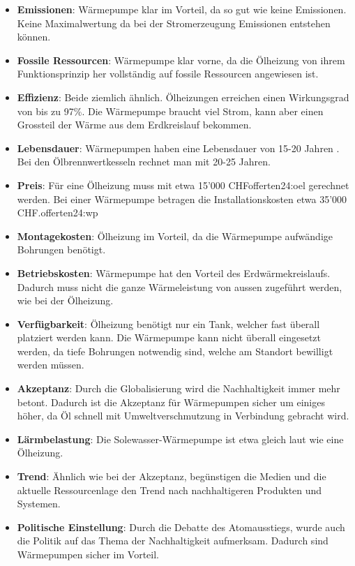 \begin{itemize}

\item \textbf{Emissionen}: Wärmepumpe klar im Vorteil, da so gut wie keine Emissionen. Keine Maximalwertung da bei der Stromerzeugung Emissionen entstehen können.

\item \textbf{Fossile Ressourcen}: Wärmepumpe klar vorne, da die Ölheizung von ihrem Funktionsprinzip her vollständig auf fossile Ressourcen angewiesen ist.

\item \textbf{Effizienz}: Beide ziemlich ähnlich. Ölheizungen erreichen einen Wirkungsgrad von bis zu 97\%. Die Wärmepumpe braucht viel Strom, kann aber einen Grossteil der Wärme aus dem Erdkreislauf bekommen.

\item \textbf{Lebensdauer}: Wärmepumpen haben eine Lebensdauer von 15-20 Jahren \cite{fws:faq}. Bei den Ölbrennwertkesseln rechnet man mit 20-25 Jahren\cite{offerten24:oel}.

\item \textbf{Preis}: Für eine Ölheizung muss mit etwa 15'000 CHF{offerten24:oel} gerechnet werden. Bei einer Wärmepumpe betragen die Installationskosten etwa 35'000 CHF.{offerten24:wp}

\item \textbf{Montagekosten}: Ölheizung im Vorteil, da die Wärmepumpe aufwändige Bohrungen benötigt.

\item \textbf{Betriebskosten}: Wärmepumpe hat den Vorteil des Erdwärmekreislaufs. Dadurch muss nicht die ganze Wärmeleistung von aussen zugeführt werden, wie bei der Ölheizung.

\item \textbf{Verfügbarkeit}: Ölheizung benötigt nur ein Tank, welcher fast überall platziert werden kann. Die Wärmepumpe kann nicht überall eingesetzt werden, da tiefe Bohrungen notwendig sind, welche am Standort bewilligt werden müssen. 

\item \textbf{Akzeptanz}: Durch die Globalisierung wird die Nachhaltigkeit immer mehr betont. Dadurch ist die Akzeptanz für Wärmepumpen sicher um einiges höher, da Öl schnell mit Umweltverschmutzung in Verbindung gebracht wird.

\item \textbf{Lärmbelastung}: Die Solewasser-Wärmepumpe ist etwa gleich laut wie eine Ölheizung.

\item \textbf{Trend}: Ähnlich wie bei der Akzeptanz, begünstigen die Medien und die aktuelle Ressourcenlage den Trend nach nachhaltigeren Produkten und Systemen.

\item \textbf{Politische Einstellung}: Durch die Debatte des Atomausstiegs, wurde auch die Politik auf das Thema der Nachhaltigkeit aufmerksam. Dadurch sind Wärmepumpen sicher im Vorteil.

\end{itemize}
